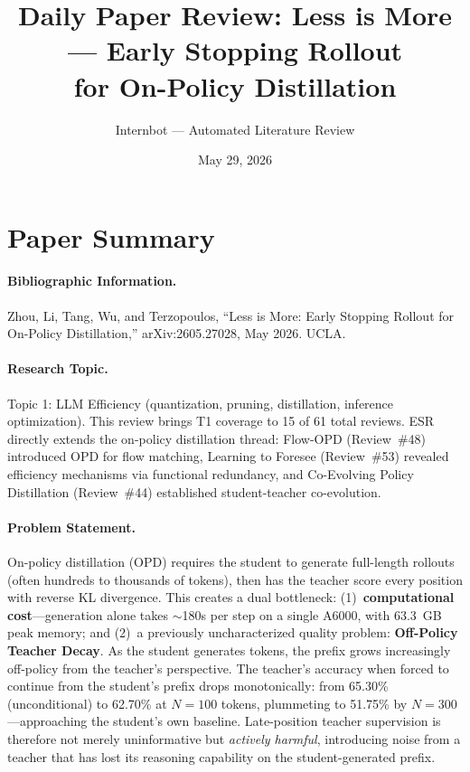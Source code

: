 \documentclass[11pt,a4paper]{article}
\title{Daily Paper Review: Less is More --- Early Stopping Rollout\\for On-Policy Distillation}
\author{Internbot --- Automated Literature Review}
\date{May 29, 2026}
\begin{document}
\maketitle

\section*{Paper Summary}

\paragraph{Bibliographic Information.}
Zhou, Li, Tang, Wu, and Terzopoulos, ``Less is More: Early Stopping Rollout for On-Policy Distillation,'' arXiv:2605.27028, May 2026. UCLA.

\paragraph{Research Topic.}
Topic 1: LLM Efficiency (quantization, pruning, distillation, inference optimization). This review brings T1 coverage to 15 of 61 total reviews. ESR directly extends the on-policy distillation thread: Flow-OPD (Review~\#48) introduced OPD for flow matching, Learning to Foresee (Review~\#53) revealed efficiency mechanisms via functional redundancy, and Co-Evolving Policy Distillation (Review~\#44) established student-teacher co-evolution.

\paragraph{Problem Statement.}
On-policy distillation (OPD) requires the student to generate full-length rollouts (often hundreds to thousands of tokens), then has the teacher score every position with reverse KL divergence. This creates a dual bottleneck: (1)~\textbf{computational cost}---generation alone takes $\sim$180s per step on a single A6000, with 63.3~GB peak memory; and (2)~a previously uncharacterized quality problem: \textbf{Off-Policy Teacher Decay}. As the student generates tokens, the prefix grows increasingly off-policy from the teacher's perspective. The teacher's accuracy when forced to continue from the student's prefix drops monotonically: from 65.30\% (unconditional) to 62.70\% at $N=100$ tokens, plummeting to 51.75\% by $N=300$---approaching the student's own baseline. Late-position teacher supervision is therefore not merely uninformative but \emph{actively harmful}, introducing noise from a teacher that has lost its reasoning capability on the student-generated prefix.
\end{document}
